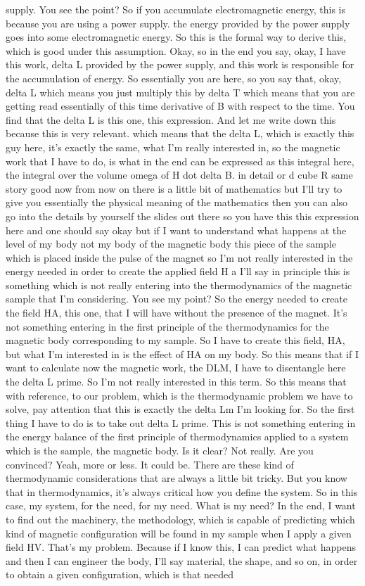 supply. You see the point? So if you accumulate electromagnetic energy, this is because you are using a power supply. the energy provided by the power supply goes into some electromagnetic energy. So this is the formal way to derive this, which is good under this assumption. Okay, so in the end you say, okay, I have this work, delta L provided by the power supply, and this work is responsible for the accumulation of energy. So essentially you are here, so you say that, okay, delta L which means you just multiply this by delta T which means that you are getting read essentially of this time derivative of B with respect to the time. You find that the delta L is this one, this expression. And let me write down this because this is very relevant. which means that the delta L, which is exactly this guy here, it's exactly the same, what I'm really interested in, so the magnetic work that I have to do, is what in the end can be expressed as this integral here, the integral over the volume omega of H dot delta B. in detail or d cube R same story good now from now on there is a little bit of mathematics but I'll try to give you essentially the physical meaning of the mathematics then you can also go into the details by yourself the slides out there so you have this this expression here and one should say okay but if I want to understand what happens at the level of my body not my body of the magnetic body this piece of the sample which is placed inside the pulse of the magnet so I'm not really interested in the energy needed in order to create the applied field H a I'll say in principle this is something which is not really entering into the thermodynamics of the magnetic sample that I'm considering. You see my point? So the energy needed to create the field HA, this one, that I will have without the presence of the magnet. It's not something entering in the first principle of the thermodynamics for the magnetic body corresponding to my sample. So I have to create this field, HA, but what I'm interested in is the effect of HA on my body. So this means that if I want to calculate now the magnetic work, the DLM, I have to disentangle here the delta L prime. So I'm not really interested in this term. So this means that with reference, to our problem, which is the thermodynamic problem we have to solve, pay attention that this is exactly the delta Lm I'm looking for. So the first thing I have to do is to take out delta L prime. This is not something entering in the energy balance of the first principle of thermodynamics applied to a system which is the sample, the magnetic body. Is it clear? Not really. Are you convinced? Yeah, more or less. It could be. There are these kind of thermodynamic considerations that are always a little bit tricky. But you know that in thermodynamics, it's always critical how you define the system. So in this case, my system, for the need, for my need. What is my need? In the end, I want to find out the machinery, the methodology, which is capable of predicting which kind of magnetic configuration will be found in my sample when I apply a given field HV. That's my problem. Because if I know this, I can predict what happens and then I can engineer the body, I'll say material, the shape, and so on, in order to obtain a given configuration, which is that needed 